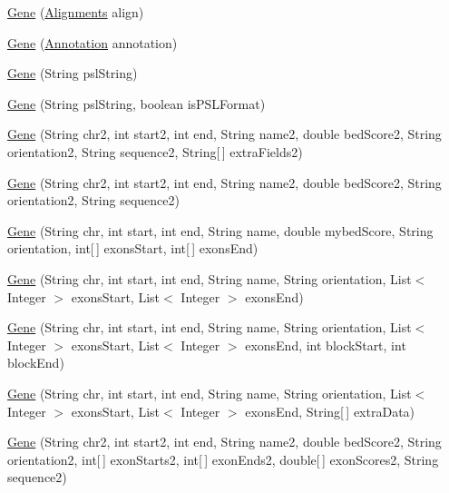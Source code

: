 \begin{DoxyCompactItemize}
\hyperlink{classumms_1_1core_1_1annotation_1_1_gene_af79232cbfb63d92f35fd036e13eb8647}{Gene} (\hyperlink{classbroad_1_1pda_1_1datastructures_1_1_alignments}{Alignments} align)
\item 
\hyperlink{classumms_1_1core_1_1annotation_1_1_gene_aaba3d6aa468ac00150fcf05a63a81693}{Gene} (\hyperlink{interfaceumms_1_1core_1_1annotation_1_1_annotation}{Annotation} annotation)
\item 
\hyperlink{classumms_1_1core_1_1annotation_1_1_gene_a95f1700c84613f3ea9518ce565f576a4}{Gene} (String psl\+String)
\item 
\hyperlink{classumms_1_1core_1_1annotation_1_1_gene_a90b8fcc396b763682a216b79e2297da0}{Gene} (String psl\+String, boolean is\+P\+S\+L\+Format)
\item 
\hyperlink{classumms_1_1core_1_1annotation_1_1_gene_ac42d18c9e794cfb506606fd9ef808f82}{Gene} (String chr2, int start2, int end, String name2, double bed\+Score2, String orientation2, String sequence2, String\mbox{[}$\,$\mbox{]} extra\+Fields2)
\item 
\hyperlink{classumms_1_1core_1_1annotation_1_1_gene_a8cdf8bf351490899f0b059d71119ad4c}{Gene} (String chr2, int start2, int end, String name2, double bed\+Score2, String orientation2, String sequence2)
\item 
\hyperlink{classumms_1_1core_1_1annotation_1_1_gene_ad9b47c67b1729c118bdb0fc72902716d}{Gene} (String chr, int start, int end, String name, double mybed\+Score, String orientation, int\mbox{[}$\,$\mbox{]} exons\+Start, int\mbox{[}$\,$\mbox{]} exons\+End)
\item 
\hyperlink{classumms_1_1core_1_1annotation_1_1_gene_af1f08fa387b97fbcb4bf53001d9ff24e}{Gene} (String chr, int start, int end, String name, String orientation, List$<$ Integer $>$ exons\+Start, List$<$ Integer $>$ exons\+End)
\item 
\hyperlink{classumms_1_1core_1_1annotation_1_1_gene_abf01f33ada44a20453aad2846f8f974b}{Gene} (String chr, int start, int end, String name, String orientation, List$<$ Integer $>$ exons\+Start, List$<$ Integer $>$ exons\+End, int block\+Start, int block\+End)
\item 
\hyperlink{classumms_1_1core_1_1annotation_1_1_gene_a3f2d0e160d787b5d11724e00b502d818}{Gene} (String chr, int start, int end, String name, String orientation, List$<$ Integer $>$ exons\+Start, List$<$ Integer $>$ exons\+End, String\mbox{[}$\,$\mbox{]} extra\+Data)
\item 
\hyperlink{classumms_1_1core_1_1annotation_1_1_gene_a66056b7bdf7eea0d5b00a25e5d88f371}{Gene} (String chr2, int start2, int end, String name2, double bed\+Score2, String orientation2, int\mbox{[}$\,$\mbox{]} exon\+Starts2, int\mbox{[}$\,$\mbox{]} exon\+Ends2, double\mbox{[}$\,$\mbox{]} exon\+Scores2, String sequence2)

\end{DoxyCompactItemize}
